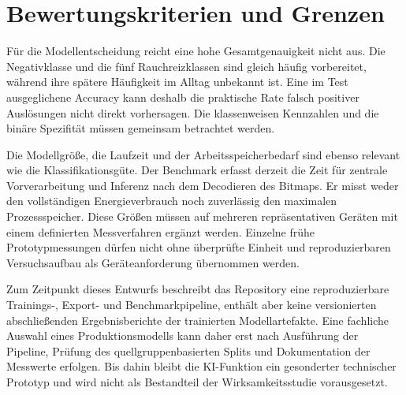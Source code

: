 \section{Bewertungskriterien und Grenzen}

Für die Modellentscheidung reicht eine hohe Gesamtgenauigkeit nicht aus. Die Negativklasse und die fünf Rauchreizklassen sind gleich häufig vorbereitet, während ihre spätere Häufigkeit im Alltag unbekannt ist. Eine im Test ausgeglichene Accuracy kann deshalb die praktische Rate falsch positiver Auslösungen nicht direkt vorhersagen. Die klassenweisen Kennzahlen und die binäre Spezifität müssen gemeinsam betrachtet werden.

Die Modellgröße, die Laufzeit und der Arbeitsspeicherbedarf sind ebenso relevant wie die Klassifikationsgüte. Der Benchmark erfasst derzeit die Zeit für zentrale Vorverarbeitung und Inferenz nach dem Decodieren des Bitmaps. Er misst weder den vollständigen Energieverbrauch noch zuverlässig den maximalen Prozessspeicher. Diese Größen müssen auf mehreren repräsentativen Geräten mit einem definierten Messverfahren ergänzt werden. Einzelne frühe Prototypmessungen dürfen nicht ohne überprüfte Einheit und reproduzierbaren Versuchsaufbau als Geräteanforderung übernommen werden.

Zum Zeitpunkt dieses Entwurfs beschreibt das Repository eine reproduzierbare Trainings-, Export- und Benchmarkpipeline, enthält aber keine versionierten abschließenden Ergebnisberichte der trainierten Modellartefakte. Eine fachliche Auswahl eines Produktionsmodells kann daher erst nach Ausführung der Pipeline, Prüfung des quellgruppenbasierten Splits und Dokumentation der Messwerte erfolgen. Bis dahin bleibt die KI-Funktion ein gesonderter technischer Prototyp und wird nicht als Bestandteil der Wirksamkeitsstudie vorausgesetzt.
